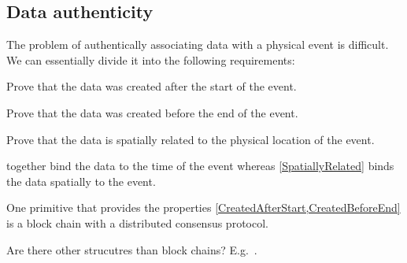 \subsection{Data authenticity}
\label{DataAuthenticity}

The problem of authentically associating data with a physical event is 
difficult.
We can essentially divide it into the following requirements:
\begin{frame}
\begin{requirements}[A]
  \item\label{CreatedAfterStart} Prove that the data was created after the 
    start of the event.
  \item\label{CreatedBeforeEnd} Prove that the data was created before the end 
    of the event.
  \item\label{SpatiallyRelated} Prove that the data is spatially related to the 
    physical location of the event.
\end{requirements} %

\pause

\end{frame}
 together bind the data to the time of 
the event whereas \cref{SpatiallyRelated} binds the data spatially to the 
event.

One primitive that provides the properties 
\cref{CreatedAfterStart,CreatedBeforeEnd} is a block chain with a distributed 
consensus protocol.

\begin{frame}
  \begin{question}
    Are there other strucutres than block chains?
    E.g.~\cite{BlockchainFreeCryptocurrencies}.
  \end{question}
\end{frame}

